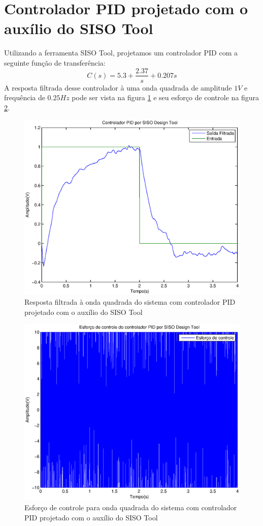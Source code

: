 \documentclass{article}
\begin{document}
   \section{Controlador PID projetado com o auxílio do SISO Tool}
   Utilizando a ferramenta SISO Tool, projetamos um controlador PID com a seguinte função de transferência:
   \begin{equation}
   \label{eq:pidcs}
   C(s) = 5.3+\frac{2.37}{s}+0.207s
   \end{equation}
   A resposta filtrada desse controlador à uma onda quadrada de amplitude $1 V$ e frequência de $0.25 Hz$ pode ser vista na figura \ref{fig:ypids} e seu esforço de controle na figura \ref{fig:upids}.
   \begin{figure}[H]
   	\centering
   	\includegraphics[width=0.8\linewidth]{ypids2}
   	\caption{Resposta filtrada à onda quadrada do sistema com controlador PID projetado com o auxílio do SISO Tool}
   	\label{fig:ypids}
   \end{figure}
   \begin{figure}[H]
   	\centering
   	\includegraphics[width=0.8\linewidth]{upids2}
   	\caption{Esforço de controle para onda quadrada do sistema com controlador PID projetado com o auxílio do SISO Tool}
   	\label{fig:upids}
   \end{figure}
\end{document}
